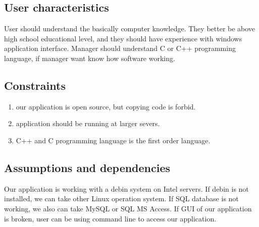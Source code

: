 \subsection{User characteristics}
User should understand the basically computer knowledge. They better be above high school educational level, 
and they should have experience with windows application interface. Manager should understand C or C++ programming language, if manager want know how software working.

\subsection{Constraints}

\begin{enumerate}
  \item our application is open source, but copying code is forbid.
  \item application should be running at larger severs.
  \item C++ and C programming language is the first order language.
\end{enumerate}

% 

\subsection{Assumptions and dependencies}
Our application is working with a debin system on Intel servers. If debin is not installed, we can take other Linux operation system.
If SQL database is not working, we also can take MySQL or SQL MS Access.
If GUI of our application is broken, user can be using command line to access our application.


